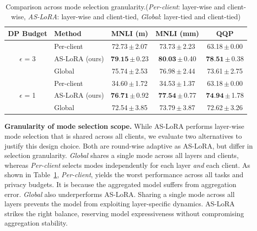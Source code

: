 \begin{table}
\vspace{-13pt}
\centering
\scriptsize
\setlength{\tabcolsep}{2pt}
\renewcommand{\arraystretch}{1.05}
\newcommand{\std}[1]{\,{\tiny$\pm$}\,\tiny #1}

\caption{Comparison across mode selection granularity.(\textit{Per-client}: layer-wise and client-wise, \textit{AS-LoRA}: layer-wise and client-tied, \textit{Global}: layer-tied and client-tied)}
\label{tab:mode_granularity}

\begin{tabular}{c l c c c}
\toprule
\textbf{DP Budget} & \textbf{Method} & \textbf{MNLI (m)} & \textbf{MNLI (mm)} & \textbf{QQP} \\
\midrule

\multirow{3}{*}{$\epsilon$ = 3}
& Per-client & 72.73\std{2.07} & 73.73\std{2.23} & 63.18\std{0.00} \\
& AS-LoRA (ours) & $\textbf{79.15}$\std{0.23} & $\textbf{80.03}$\std{0.40} & $\textbf{78.51}$\std{0.38} \\
& Global & 75.74\std{2.53} & 76.98\std{2.44} & 73.61\std{2.75} \\

\midrule

\multirow{3}{*}{$\epsilon$ = 1}
& Per-client & 34.60\std{1.72} & 34.53\std{1.37} & 63.18\std{0.00} \\
& AS-LoRA (ours) & $\textbf{76.71}$\std{0.92} & $\textbf{77.54}$\std{0.77} & $\textbf{74.94}$\std{1.78} \\
& Global & 72.54\std{3.85} & 73.79\std{3.87} & 72.62\std{3.26} \\
\bottomrule
\end{tabular}
\vspace{-15pt}
\end{table}

\textbf{Granularity of mode selection scope.}
While AS-LoRA performs layer-wise mode selection that is shared across all clients, we evaluate two alternatives to justify this design choice. Both are round-wise adaptive as AS-LoRA, but differ in selection granularity. \textit{Global} shares a single mode across all layers and clients, whereas \textit{Per-client} selects modes independently for each layer \emph{and} each client. As shown in Table~\ref{tab:mode_granularity}, \textit{Per-client}, yields the worst performance across all tasks and privacy budgets. It is because the aggregated model suffers from aggregation error. \textit{Global} also underperforms AS-LoRA. Sharing a single mode across all layers prevents the model from exploiting layer-specific dynamics. AS-LoRA strikes the right balance, reserving model expressiveness without compromising aggregation stability.


